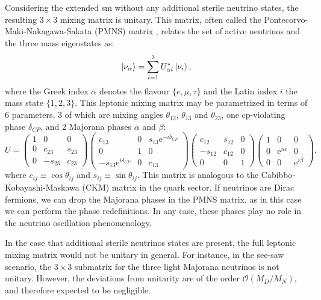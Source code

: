 Considering the extended \gls{sm} without any additional sterile neutrino states, the  resulting $3 \times 3$ mixing matrix is unitary. This matrix, often called the Pontecorvo-Maki-Nakagawa-Sakata (PMNS) matrix \cite{Pontecorvo1957, Maki1962}, relates the set of active neutrinos and the three mass eigenstates as:
\begin{equation}\label{eq:nu_flavour_basis}
\ket{\nu_{\alpha}} = \sum_{i=1}^{3} U^{*}_{\alpha i} \ket{\nu_{i}},
\end{equation}
where the Greek index $\alpha$ denotes the flavour $\{e,\mu,\tau\}$ and the Latin index $i$ the mass state $\{1,2,3\}$. This leptonic mixing matrix may be parametrized in terms of 6 parameters, 3 of which are mixing angles $\theta_{12}$, $\theta_{13}$ and $\theta_{23}$, one \gls{cp}-violating phase $\delta_{CP}$, and 2 Majorana phases $\alpha$ and $\beta$:
\begin{equation}\label{eq:pmns_matrix}
	U = \begin{pmatrix}1&0&0\\0&c_{23}&s_{23}\\0&-s_{23}&c_{23}\end{pmatrix} \begin{pmatrix}c_{13}&0&s_{13} \mathrm{e}^{-i\delta_{CP}}\\0&1&0\\-s_{13} \mathrm{e}^{i\delta_{CP}}&0&c_{13}\end{pmatrix} \begin{pmatrix}c_{12}&s_{12}&0\\-s_{12}&c_{12}&0\\0&0&1\end{pmatrix} \begin{pmatrix}1&0&0\\0&\mathrm{e}^{i\alpha}&0\\0&0&\mathrm{e}^{i\beta}\end{pmatrix},
\end{equation}
where $c_{ij} \equiv \cos \theta_{ij}$ and $s_{ij} \equiv \sin \theta_{ij}$. This matrix is analogous to the Cabibbo-Kobayashi-Maskawa (CKM) matrix in the quark sector. If neutrinos are Dirac fermions, we can drop the Majorana phases in the PMNS matrix, as in this case we can perform the phase redefinitions. In any case, these phases play no role in the neutrino oscillation phenomenology.

In the case that additional sterile neutrinos states are present, the full leptonic mixing matrix would not be unitary in general. For instance, in the see-saw scenario, the $3 \times 3$ submatrix for the three light Majorana neutrinos is not unitary. However, the deviations from unitarity are of the order $\mathcal{O}(M_{D}/M_{N})$, and therefore expected to be negligible.


